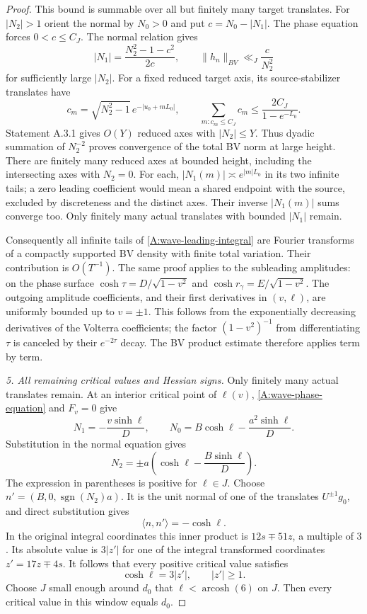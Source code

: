 \begin{proof}
This bound is summable over all but finitely many target translates.
For $|N_2|>1$ orient the normal by $N_0>0$ and put
$c=N_0-|N_1|$.
The phase equation forces $0<c\leq C_J$.
The normal relation gives
\[
 |N_1|=\frac{N_2^2-1-c^2}{2c},
 \qquad \|h_n\|_{BV}\ll_J\frac{c}{N_2^2}
\]
for sufficiently large $|N_2|$.
For a fixed reduced target axis, its source-stabilizer translates
have
\[
 c_m=\sqrt{N_2^2-1}\,e^{-|u_0+mL_0|},
 \qquad
 \sum_{m:c_m\leq C_J}c_m
       \leq\frac{2C_J}{1-e^{-L_0}}.
\]
Statement A.3.1 gives $O(Y)$ reduced axes with $|N_2|\leq Y$.
Thus dyadic summation of $N_2^{-2}$ proves convergence of the
total BV norm at large height.
There are finitely many reduced axes at bounded height, including
the intersecting axes with $N_2=0$.
For each, $|N_1(m)|\asymp e^{|m|L_0}$ in its two infinite tails;
a zero leading coefficient would mean a shared endpoint with
the source, excluded by discreteness and the distinct axes.
Their inverse $|N_1(m)|$ sums converge too.
Only finitely many actual translates with bounded $|N_1|$ remain.

Consequently all infinite tails of \eqref{A:wave-leading-integral}
are Fourier transforms of a compactly supported BV density with
finite total variation. Their contribution is $O(T^{-1})$.
The same proof applies to the subleading amplitudes:
on the phase surface $\cosh\tau=D/\sqrt{1-v^2}$ and
$\cosh r_\gamma=E/\sqrt{1-v^2}$.
The outgoing amplitude coefficients, and their first derivatives
in $(v,\ell)$, are uniformly bounded up to $v=\pm1$.
This follows from the exponentially decreasing derivatives of
the Volterra coefficients; the factor $(1-v^2)^{-1}$ from
differentiating $\tau$ is canceled by their $e^{-2\tau}$ decay.
The BV product estimate therefore applies term by term.

\emph{5. All remaining critical values and Hessian signs.}
Only finitely many actual translates remain.
At an interior critical point of $\ell(v)$,
\eqref{A:wave-phase-equation} and $F_v=0$ give
\[
 N_1=-\frac{v\sinh\ell}{D},\qquad
 N_0=B\cosh\ell-\frac{a^2\sinh\ell}{D}.
\]
Substitution in the normal equation gives
\[
 N_2=\pm a\left(\cosh\ell-\frac{B\sinh\ell}{D}\right).
\]
The expression in parentheses is positive for $\ell\in J$.
Choose
$n'=(B,0,\operatorname{sgn}(N_2)a)$.
It is the unit normal of one of the translates $U^{\pm1}g_0$,
and direct substitution gives
\[
 \langle n,n'\rangle=-\cosh\ell.
\]
In the original integral coordinates this inner product is
$12s\mp51z$, a multiple of $3$.
Its absolute value is $3|z'|$ for one of the integral transformed
coordinates $z'=17z\mp4s$.
It follows that every positive critical value satisfies
\[
 \cosh\ell=3|z'|,\qquad |z'|\geq1.
\]
Choose $J$ small enough around $d_0$ that
$\ell<\operatorname{arcosh}(6)$ on $J$.
Then every critical value in this window equals $d_0$.


\end{proof}
